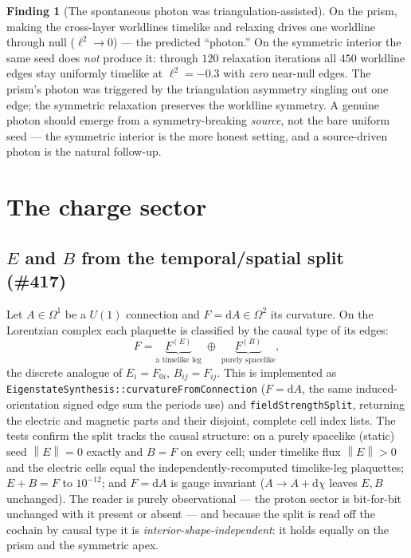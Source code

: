 \documentclass[11pt]{article}
\theoremstyle{definition}
\newtheorem{finding}{Finding}
\newcommand{\norm}[1]{\left\lVert #1 \right\rVert}
\newcommand{\dd}{\mathrm{d}}
\newcommand{\code}[1]{\texttt{#1}}
\begin{document}
\begin{finding}[The spontaneous photon was triangulation-assisted]
\label{find:photon}
On the prism, making the cross-layer worldlines timelike and relaxing drives one worldline
through null ($\ell^2\to0$) --- the predicted ``photon.'' On the symmetric interior the
same seed does \emph{not} produce it: through $120$ relaxation iterations all $450$
worldline edges stay uniformly timelike at $\ell^2=-0.3$ with \emph{zero} near-null edges.
The prism's photon was triggered by the triangulation asymmetry singling out one edge; the
symmetric relaxation preserves the worldline symmetry. A genuine photon should emerge from
a symmetry-breaking \emph{source}, not the bare uniform seed --- the symmetric interior is
the more honest setting, and a source-driven photon is the natural follow-up.
\end{finding}

\section{The charge sector}
\label{sec:charge}

\subsection{$E$ and $B$ from the temporal/spatial split (\#417)}
\label{sec:eb}

Let $A\in\Omega^1$ be a $U(1)$ connection and $F=\dd A\in\Omega^2$ its curvature. On the
Lorentzian complex each plaquette is classified by the causal type of its edges:
\begin{equation}
  F = \underbrace{F^{(E)}}_{\text{a timelike leg}}
      \;\oplus\;
      \underbrace{F^{(B)}}_{\text{purely spacelike}} ,
\end{equation}
the discrete analogue of $E_i=F_{0i}$, $B_{ij}=F_{ij}$. This is implemented as
\code{EigenstateSynthesis::}\allowbreak\code{curvatureFromConnection} ($F=\dd A$, the same induced-orientation
signed edge sum the periods use) and \code{fieldStrengthSplit}, returning the electric and
magnetic parts and their disjoint, complete cell index lists. The tests confirm the split
tracks the causal structure: on a purely spacelike (static) seed $\norm{E}=0$ exactly and
$B=F$ on every cell; under timelike flux $\norm{E}>0$ and the electric cells equal the
independently-recomputed timelike-leg plaquettes; $E+B=F$ to $10^{-12}$; and $F=\dd A$ is
gauge invariant ($A\to A+\dd\chi$ leaves $E,B$ unchanged). The reader is purely
observational --- the proton sector is bit-for-bit unchanged with it present or absent ---
and because the split is read off the cochain by causal type it is
\emph{interior-shape-independent}: it holds equally on the prism and the symmetric apex.
\end{document}
